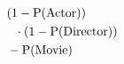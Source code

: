 $\!\begin{aligned}
  &(1 - \operatorname{P}(\text{Actor})) \\
  &~~\cdot (1 - \operatorname{P}(\text{Director})) \\
  &- \operatorname{P}(\text{Movie})
\end{aligned}$
